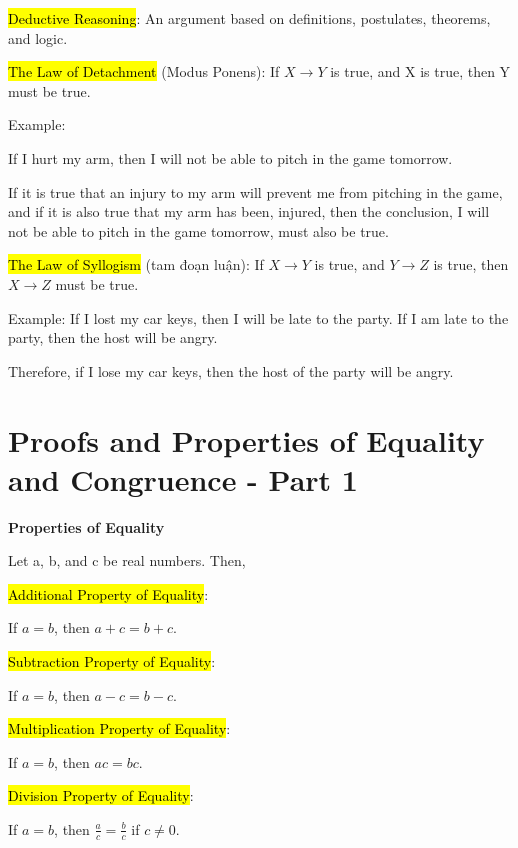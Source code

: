 \hl{Deductive Reasoning}: An argument based on definitions, postulates, theorems, and logic.

\vspace{.4cm}

\hl{The Law of Detachment} (Modus Ponens): If $X \rightarrow Y$ is true, and X is true, then Y must be true.

Example:

If I hurt my arm, then I will not be able to pitch in the game tomorrow.

If it is true that an injury to my arm will prevent me from pitching in the game, and if it is also true that my arm has been, injured, then the conclusion, I will not be able to pitch in the game tomorrow, must also be true.

\vspace{.5cm}

\hl{The Law of Syllogism} (tam đoạn luận): If $X \rightarrow Y$ is true, and $Y \rightarrow Z$ is true, then $X \rightarrow Z$ must be true.

Example: If I lost my car keys, then I will be late to the party. If I am late to the party, then the host will be angry.

Therefore, if I lose my car keys, then the host of the party will be angry.

\section{Proofs and Properties of Equality and Congruence - Part 1}

\vspace{0.3 cm}

\centerline{\textbf{\LARGE Properties of Equality}}

\vspace{0.5cm}

Let a, b, and c be real numbers. Then,

\hl{Additional Property of Equality}:

If $a=b$, then $a+c=b+c$.

\hl{Subtraction Property of Equality}:

If $a=b$, then $a-c=b-c$.

\hl{Multiplication Property of Equality}:

If $a=b$, then $ac=bc$.

\hl{Division Property of Equality}:

If $a=b$, then $\frac{a}{c}=\frac{b}{c}$ if $c\neq 0$.

